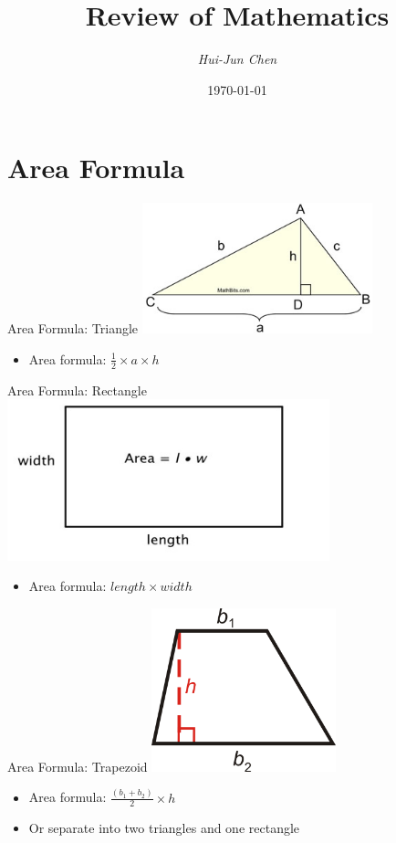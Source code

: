 \documentclass{beamer}
\title{Review of Mathematics}
\author{\textit{Hui-Jun Chen}}
\date{\today}
\begin{document}
\maketitle

\section{Area Formula}%
\label{sec:area_formula}

\begin{frame}[t]{Area Formula: Triangle}
    \centering
    \includegraphics[width=0.5\textwidth]{./figures/triArea2.jpg}
    \begin{itemize}
        \item Area formula: $\frac{1}{2}  \times a  \times h$
    \end{itemize}
\end{frame}

\begin{frame}[t]{Area Formula: Rectangle}
    \centering
    \includegraphics[width=0.7\textwidth]{./figures/qwe.jpg}
    \begin{itemize}
        \item Area formula: $length \times  width$
    \end{itemize}

\end{frame}

\begin{frame}[t]{Area Formula: Trapezoid}
    \centering
    \includegraphics[width=0.4\textwidth]{./figures/trapezoid.png}
    \begin{itemize}
	\item Area formula: $\frac{\left( b_{1} + b_{2}  \right) }{2}  \times h$
	\item Or separate into two triangles and one rectangle
    \end{itemize}
\end{frame}
\end{document}
